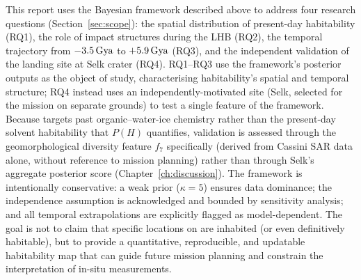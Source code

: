 This report uses the Bayesian framework described above to address four research questions (Section~\ref{sec:scope}): the spatial distribution of present-day habitability (RQ1), the role of impact structures during the LHB (RQ2), the temporal trajectory from $-3.5\,\text{Gya}$ to $+5.9\,\text{Gya}$ (RQ3), and the independent validation of the \dragonfly{} landing site at Selk crater (RQ4).  RQ1--RQ3 use the framework's posterior outputs as the object of study, characterising habitability's spatial and temporal structure; RQ4 instead uses an independently-motivated site (Selk, selected for the \dragonfly{} mission on separate grounds) to test a single feature of the framework. Because \dragonfly{} targets past organic--water-ice chemistry rather than the present-day solvent habitability that $P(H)$ quantifies, validation is assessed through the geomorphological diversity feature $f_7$ specifically (derived from Cassini SAR data alone, without reference to mission planning) rather than through Selk's aggregate posterior score (Chapter~\ref{ch:discussion}).  The framework is intentionally conservative: a weak prior ($\kappa = 5$) ensures data dominance; the independence assumption is acknowledged and bounded by sensitivity analysis; and all temporal extrapolations are explicitly flagged as model-dependent.  The goal is not to claim that specific locations on \titan{} are inhabited (or even definitively habitable), but to provide a quantitative, reproducible, and updatable habitability map that can guide future mission planning and constrain the interpretation of in-situ measurements.